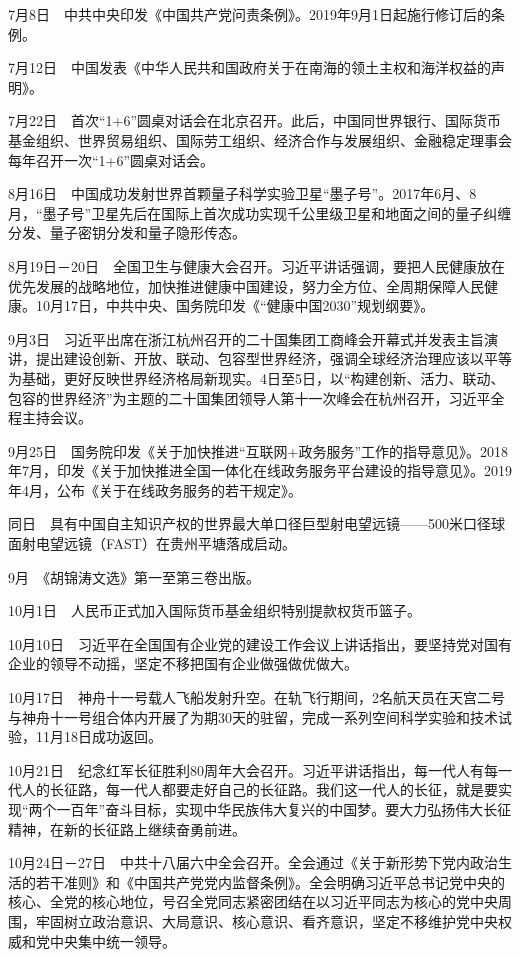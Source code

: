 \documentclass[10pt,a4paper,twocolumn]{book}
\begin{document}
7月8日　中共中央印发《中国共产党问责条例》。2019年9月1日起施行修订后的条例。

7月12日　中国发表《中华人民共和国政府关于在南海的领土主权和海洋权益的声明》。

7月22日　首次“1+6”圆桌对话会在北京召开。此后，中国同世界银行、国际货币基金组织、世界贸易组织、国际劳工组织、经济合作与发展组织、金融稳定理事会每年召开一次“1+6”圆桌对话会。

8月16日　中国成功发射世界首颗量子科学实验卫星“墨子号”。2017年6月、8月，“墨子号”卫星先后在国际上首次成功实现千公里级卫星和地面之间的量子纠缠分发、量子密钥分发和量子隐形传态。

8月19日－20日　全国卫生与健康大会召开。习近平讲话强调，要把人民健康放在优先发展的战略地位，加快推进健康中国建设，努力全方位、全周期保障人民健康。10月17日，中共中央、国务院印发《“健康中国2030”规划纲要》。

9月3日　习近平出席在浙江杭州召开的二十国集团工商峰会开幕式并发表主旨演讲，提出建设创新、开放、联动、包容型世界经济，强调全球经济治理应该以平等为基础，更好反映世界经济格局新现实。4日至5日，以“构建创新、活力、联动、包容的世界经济”为主题的二十国集团领导人第十一次峰会在杭州召开，习近平全程主持会议。

9月25日　国务院印发《关于加快推进“互联网+政务服务”工作的指导意见》。2018年7月，印发《关于加快推进全国一体化在线政务服务平台建设的指导意见》。2019年4月，公布《关于在线政务服务的若干规定》。

同日　具有中国自主知识产权的世界最大单口径巨型射电望远镜——500米口径球面射电望远镜（FAST）在贵州平塘落成启动。

9月　《胡锦涛文选》第一至第三卷出版。

10月1日　人民币正式加入国际货币基金组织特别提款权货币篮子。

10月10日　习近平在全国国有企业党的建设工作会议上讲话指出，要坚持党对国有企业的领导不动摇，坚定不移把国有企业做强做优做大。

10月17日　神舟十一号载人飞船发射升空。在轨飞行期间，2名航天员在天宫二号与神舟十一号组合体内开展了为期30天的驻留，完成一系列空间科学实验和技术试验，11月18日成功返回。

10月21日　纪念红军长征胜利80周年大会召开。习近平讲话指出，每一代人有每一代人的长征路，每一代人都要走好自己的长征路。我们这一代人的长征，就是要实现“两个一百年”奋斗目标，实现中华民族伟大复兴的中国梦。要大力弘扬伟大长征精神，在新的长征路上继续奋勇前进。

10月24日－27日　中共十八届六中全会召开。全会通过《关于新形势下党内政治生活的若干准则》和《中国共产党党内监督条例》。全会明确习近平总书记党中央的核心、全党的核心地位，号召全党同志紧密团结在以习近平同志为核心的党中央周围，牢固树立政治意识、大局意识、核心意识、看齐意识，坚定不移维护党中央权威和党中央集中统一领导。
\end{document}
